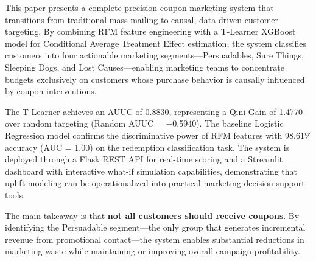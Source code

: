 \documentclass[11pt,a4paper,twoside]{article}
\begin{document}
This paper presents a complete precision coupon marketing system that transitions from traditional mass mailing to causal, data-driven customer targeting. By combining RFM feature engineering with a T-Learner XGBoost model for Conditional Average Treatment Effect estimation, the system classifies customers into four actionable marketing segments---Persuadables, Sure Things, Sleeping Dogs, and Lost Causes---enabling marketing teams to concentrate budgets exclusively on customers whose purchase behavior is causally influenced by coupon interventions.

The T-Learner achieves an AUUC of 0.8830, representing a Qini Gain of 1.4770 over random targeting (Random AUUC = $-$0.5940). The baseline Logistic Regression model confirms the discriminative power of RFM features with 98.61\% accuracy (AUC = 1.00) on the redemption classification task. The system is deployed through a Flask REST API for real-time scoring and a Streamlit dashboard with interactive what-if simulation capabilities, demonstrating that uplift modeling can be operationalized into practical marketing decision support tools.

The main takeaway is that \textbf{not all customers should receive coupons}. By identifying the Persuadable segment---the only group that generates incremental revenue from promotional contact---the system enables substantial reductions in marketing waste while maintaining or improving overall campaign profitability.

\clearpage

\begingroup
\setlength{\parskip}{0pt}
\end{document}
